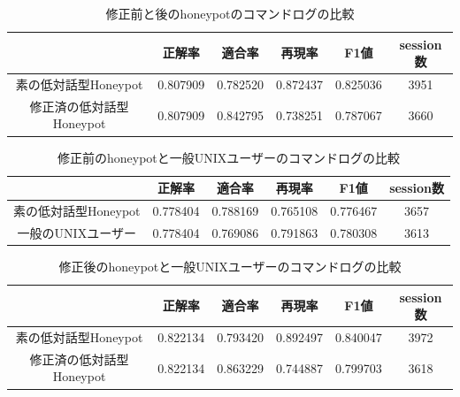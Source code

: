 \vspace{7mm}
\setlength{\myheighta}{10mm}
\begin{table}[h]
 \caption{修正前と後のhoneypotのコマンドログの比較}
 \label{table:scdvcompare1}
 \centering
  \begin{tabular}{|c||c|c|c|c|c|}
   \hline
   \parbox[c][\myheighta][c]{0cm}{}  & 正解率 & 適合率 & 再現率 & F1値 & session数\\
   \hline \hline 
     \parbox[c][\myheighta][c]{0cm}{} 素の低対話型Honeypot  & 0.807909 & 0.782520 & 0.872437 & 0.825036 & 3951\\
     \hline
     \parbox[c][\myheighta][c]{0cm}{} 修正済の低対話型Honeypot  & 0.807909 & 0.842795 & 0.738251 & 0.787067 & 3660\\
     \hline
  \end{tabular}
\end{table}
\vspace{7mm}
\vspace{7mm}
\setlength{\myheighta}{10mm}
\begin{table}[h]
 \caption{修正前のhoneypotと一般UNIXユーザーのコマンドログの比較}
 \label{table:scdvcompare2}
 \centering
  \begin{tabular}{|c||c|c|c|c|c|}
   \hline
   \parbox[c][\myheighta][c]{0cm}{}  & 正解率 & 適合率 & 再現率 & F1値 & session数\\
   \hline \hline 
     \parbox[c][\myheighta][c]{0cm}{} 素の低対話型Honeypot  & 0.778404 & 0.788169 & 0.765108 & 0.776467 & 3657\\
     \hline
     \parbox[c][\myheighta][c]{0cm}{} 一般のUNIXユーザー  & 0.778404 & 0.769086 & 0.791863 & 0.780308 & 3613\\
     \hline
  \end{tabular}
\end{table}
\vspace{7mm}
\vspace{7mm}
\setlength{\myheighta}{10mm}
\begin{table}[h]
 \caption{修正後のhoneypotと一般UNIXユーザーのコマンドログの比較}
 \label{table:scdvcompare3}
 \centering
  \begin{tabular}{|c||c|c|c|c|c|}
   \hline
   \parbox[c][\myheighta][c]{0cm}{}  & 正解率 & 適合率 & 再現率 & F1値 & session数\\
   \hline \hline 
     \parbox[c][\myheighta][c]{0cm}{} 素の低対話型Honeypot  & 0.822134 & 0.793420 & 0.892497 & 0.840047 & 3972\\
     \hline
     \parbox[c][\myheighta][c]{0cm}{} 修正済の低対話型Honeypot  & 0.822134 & 0.863229 & 0.744887 & 0.799703 & 3618\\
     \hline
  \end{tabular}
\end{table}
\vspace{7mm}

